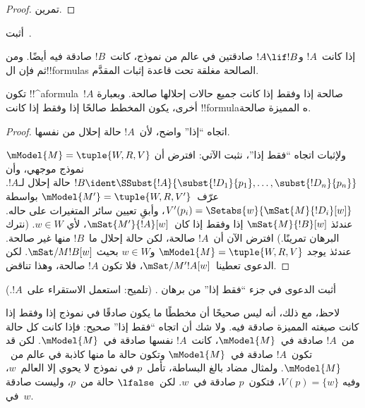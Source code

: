 \documentclass[../../../include/open-logic-section]{subfiles}
\begin{document}
\begin{proof}
  تمرين.
\end{proof}

\begin{prob}
  أثبت~.
\end{prob}

\begin{prop}
  إذا كانت~$!A$ و$!A \lif !B$ صادقتين في عالم من نموذج، كانت~$!B$
  صادقة فيه أيضًا. ومن ثم فإن ال!!{formula}s الصالحة مغلقة تحت قاعدة
  إثبات المقدَّم.
\end{prop}

\begin{prop}
  تكون !!^a{formula}~$!A$ صالحة إذا وفقط إذا كانت جميع حالات إحلالها
  صالحة. وبعبارة أخرى، يكون المخطط صالحًا إذا وفقط إذا كانت
  !!{formula}ه المميزة صالحة.
\end{prop}

\begin{proof}
  اتجاه ``إذا'' واضح، لأن~$!A$ حالة إحلال من نفسها.

  ولإثبات اتجاه ``فقط إذا''، نثبت الآتي: افترض أن
  $\mModel{M} = \tuple{W, R, V}$ نموذج موجهي، وأن
  $!B \ident \SSubst{!A}{\subst{!D_1}{p_1},\dots,\subst{!D_n}{p_n}}$
  حالة إحلال لـ$!A$. عرّف~$\mModel{M'} = \tuple{W, R, V'}$ بواسطة
  $V'(p_i) = \Setabs{w}{\mSat{M}{!D_i}[w]}$، وأبقِ تعيين سائر
  المتغيرات على حاله. عندئذ
  $\mSat{M}{!B}[w]$ إذا وفقط إذا كان~$\mSat{M'}{!A}[w]$، لأي
  $w \in W$. (نترك البرهان تمرينًا.) افترض الآن أن~$!A$ صالحة، لكن
  حالة إحلال ما~$!B$ منها غير صالحة. عندئذ يوجد
  $\mModel{M} = \tuple{W, R, V}$ و$w \in W$ بحيث
  $\mSat/{M}{!B}[w]$. لكن الدعوى تعطينا~$\mSat/{M'}{!A}[w]$، فلا تكون
  $!A$ صالحة، وهذا تناقض.
\end{proof}

\begin{prob}
  أثبت الدعوى في جزء ``فقط إذا'' من برهان
  . (تلميح: استعمل
  الاستقراء على~$!A$.)
\end{prob}

لاحظ، مع ذلك، أنه ليس صحيحًا أن مخططًا ما يكون صادقًا في نموذج إذا
وفقط إذا كانت صيغته المميزة صادقة فيه. ولا شك أن اتجاه ``فقط إذا''
صحيح: فإذا كانت كل حالة من~$!A$ صادقة في~$\mModel{M}$، كانت~$!A$
نفسها صادقة في~$\mModel{M}$. لكن قد تكون~$!A$ صادقة في~$\mModel{M}$
وتكون حالة ما منها كاذبة في عالم من~$\mModel{M}$. ولمثال مضاد بالغ
البساطة، تأمل~$p$ في نموذج لا يحوي إلا العالم~$w$، وفيه
$V(p) = \{w\}$، فتكون~$p$ صادقة في~$w$. لكن~$\lfalse$ حالة من~$p$،
وليست صادقة في~$w$.
\end{document}
